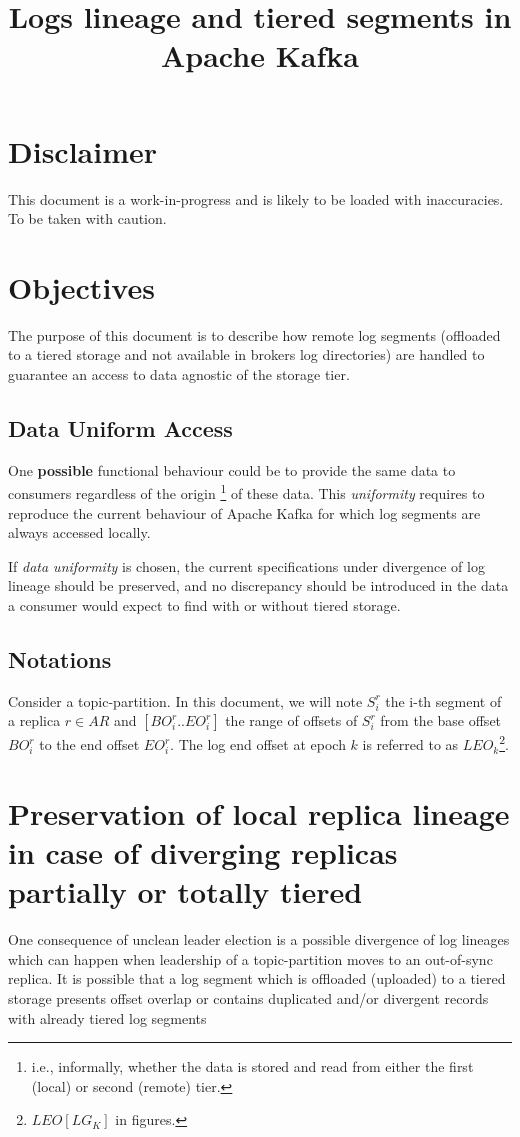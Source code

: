 \documentclass{article}
\title{Logs lineage and tiered segments in Apache Kafka}
\begin{document}
\section{Disclaimer}
This document is a work-in-progress and is likely to be loaded with inaccuracies. To be taken with caution.

\section{Objectives}
The purpose of this document is to describe how remote log segments (offloaded to a tiered storage and not available in brokers log directories) are handled to guarantee an access to data agnostic of the storage tier.


\subsection{Data Uniform Access}

One \textbf{possible} functional behaviour could be to provide the same data to consumers regardless of the origin \footnote{i.e., informally, whether the data is stored and read from either the first (local) or second (remote) tier.} of these data. This \textit{uniformity} requires to reproduce the current behaviour of Apache Kafka for which log segments are always accessed locally.

If \textit{data uniformity} is chosen, the current specifications under divergence of log lineage should be preserved, and no discrepancy should be introduced in the data a consumer would expect to find with or without tiered storage.

\subsection{Notations}
Consider a topic-partition. In this document, we will note $S_i^r$ the i-th segment of a replica $r \in AR$ and $[BO_i^r..EO_i^r]$ the range of offsets of $S_i^r$ from the base offset $BO_i^r$ to the end offset $EO_i^r$. The log end offset at epoch $k$ is referred to as $LEO_k$\footnote{$LEO[LG_K]$ in figures.}.

\section{Preservation of local replica lineage in case of diverging replicas partially or totally tiered}

One consequence of unclean leader election is a possible divergence of log lineages which can happen when leadership of a topic-partition moves to an out-of-sync replica. It is possible that a log segment which is offloaded (uploaded) to a tiered storage presents offset overlap or contains duplicated and/or divergent records with already tiered log segments
\end{document}
